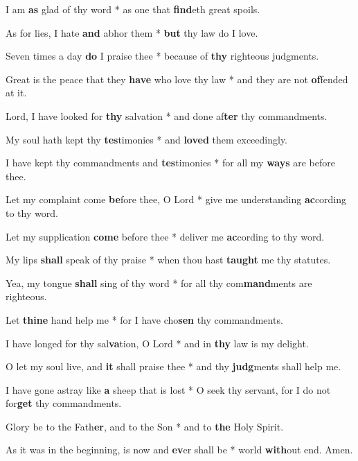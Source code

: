 \begin{multicols}{2}
	I am \textbf{as} glad of thy word * as one that \textbf{find}eth great spoils.
	
	As for lies, I hate \textbf{and} abhor them * \textbf{but} thy law do I love.
	
	Seven times a day \textbf{do} I praise thee * because of \textbf{thy} righteous judgments.
	
	Great is the peace that they \textbf{have} who love thy law * and they are not \textbf{of}fended at it.
	
	Lord, I have looked for \textbf{thy} salvation * and done af\textbf{ter} thy commandments.
	
	My soul hath kept thy \textbf{tes}timonies * and \textbf{loved} them exceedingly.
	
	I have kept thy commandments and \textbf{tes}timonies * for all my \textbf{ways} are before thee.
	
	Let my complaint come \textbf{be}fore thee, O Lord * give me understanding \textbf{ac}cording to thy word.
	
	Let my supplication \textbf{come} before thee * deliver me \textbf{ac}cording to thy word.
	
	My lips \textbf{shall} speak of thy praise * when thou hast \textbf{taught} me thy statutes.
	
	Yea, my tongue \textbf{shall} sing of thy word * for all thy com\textbf{mand}ments are righteous.
	
	Let \textbf{thine} hand help me * for I have cho\textbf{sen} thy commandments.
	
	I have longed for thy sal\textbf{va}tion, O Lord * and in \textbf{thy} law is my delight.
	
	O let my soul live, and \textbf{it} shall praise thee * and thy \textbf{judg}ments shall help me.
	
	I have gone astray like \textbf{a} sheep that is lost * O seek thy servant, for I do not for\textbf{get} thy commandments.
	
	Glory be to the Fath\textbf{er}, and to the Son * and to \textbf{the} Holy Spirit.
	
	As it was in the beginning, is now and \textbf{ev}er shall be * world \textbf{with}out end. Amen.
\end{multicols}